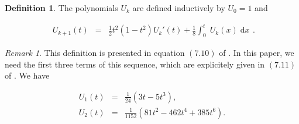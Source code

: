 \documentclass{jams-l}
\theoremstyle{definition}
\newtheorem{definition}[theorem]{Definition}
\theoremstyle{remark}
\newtheorem{remark}[theorem]{Remark}
\numberwithin{equation}{section}
\begin{document}
        \begin{definition}
        
            The polynomials $U_k$ are defined inductively by $U_0 = 1$ and
            
            \[ \begin{array}{lll}
                    U_{k+1} \left( t \right) & = & \frac{1}{2} t^2 \left( 1 - t^2 \right) U_k' \left( t \right) + \frac{1}{8} \int_0^t \; U_k \left( x \right) \; \mathrm{d}x
                \end{array} . \]
        
        \end{definition}
        
        \begin{remark}
        
            This definition is presented in equation $\left( 7.10 \right)$ of \cite[Sec. 10.7.3]{MR1429619}. In this paper, we need the first three terms of this sequence, which are explicitely given in $\left( 7.11 \right)$ of \cite[Sec. 10.7.3]{MR1429619}. We have
            
            \[ \begin{array}{lll}
                    U_1 \left( t \right) & = & \frac{1}{24} \left( 3t - 5t^3 \right), \\[0.5em]
                    U_2 \left( t \right) & = & \frac{1}{1152} \left( 81 t^2 - 462 t^4 + 385 t^6 \right).
                \end{array} \]
        
        \end{remark}
        
\end{document}
